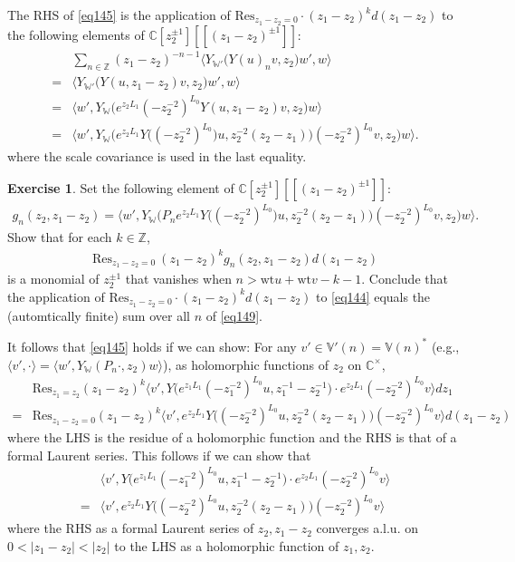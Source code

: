 \documentclass[11pt,b5paper,notitlepage]{article}
\theoremstyle{definition}
\newtheorem{exe}[df]{Exercise}
\theoremstyle{plain}
\newcommand{\Res}{\mathrm{Res}}
\newcommand{\bk}[1]{\langle {#1}\rangle}
\newcommand{\bigbk}[1]{\big\langle {#1}\big\rangle}
\newcommand{\Bigbk}[1]{\Big\langle {#1}\Big\rangle}
\newcommand{\Vbb}{\mathbb V}
\newcommand{\Wbb}{\mathbb W}
\newcommand{\Cbb}{\mathbb C}
\newcommand{\Nbb}{\mathbb N}
\newcommand{\Zbb}{\mathbb Z}
\newcommand{\wt}{\mathrm{wt}}
\numberwithin{equation}{section}
\begin{document}
The RHS of \eqref{eq145} is the application of $\Res_{z_1-z_2=0}\cdot (z_1-z_2)^kd(z_1-z_2)$ to the following  elements of $\Cbb[z_2^{\pm1}][[(z_1-z_2)^{\pm1}]]$:
\begin{align}
&\sum_{n\in\Zbb}(z_1-z_2)^{-n-1}\bigbk{Y_{\Wbb'}\big(Y(u)_nv,z_2\big)w',w}\nonumber\\
=&\bigbk{Y_{\Wbb'}\big(Y(u,z_1-z_2)v,z_2\big)w',w}\nonumber\\
=&\bigbk{w',Y_\Wbb\big(e^{z_2L_1}(-z_2^{-2})^{L_0}Y(u,z_1-z_2)v,z_2\big)w}\nonumber\\
=&\bigbk{w',Y_\Wbb\big(e^{z_2L_1}Y\big((-z_2^{-2})^{L_0})u,z_2^{-2}(z_2-z_1)\big)(-z_2^{-2})^{L_0}v,z_2\big)w}.\label{eq144}
\end{align}
where the scale covariance is used in the last equality.
\begin{exe}
Set the following element of $\Cbb[z_2^{\pm1}][[(z_1-z_2)^{\pm1}]]$:
\begin{align*}
g_n(z_2,z_1-z_2)=\bigbk{w',Y_\Wbb\big(P_ne^{z_2L_1}Y\big((-z_2^{-2})^{L_0})u,z_2^{-2}(z_2-z_1)\big)(-z_2^{-2})^{L_0}v,z_2\big)w}.	
\end{align*}
Show that for each $k\in\Zbb$,
\begin{align}
\Res_{z_1-z_2=0}~(z_1-z_2)^kg_n(z_2,z_1-z_2)d(z_1-z_2)	\label{eq149}
\end{align}
is a monomial of $z_2^{\pm1}$ that vanishes when $n>\wt u+\wt v-k-1$. Conclude that the application of $\Res_{z_1-z_2=0}\cdot (z_1-z_2)^kd(z_1-z_2)$ to \eqref{eq144} equals the (automtically finite) sum over all $n$ of \eqref{eq149}.
\end{exe}


It follows that \eqref{eq145} holds 
if we can show: For any $v'\in\Vbb'(n)=\Vbb(n)^*$ (e.g.,  $\bk{v',\cdot}=\bk{w',Y_\Wbb(P_n\cdot,z_2)w}$), as holomorphic functions of $z_2$ on $\Cbb^\times$,
\begin{align}
&\Res_{z_1=z_2}(z_1-z_2)^k\bigbk{v',Y\big(e^{z_1L_1}(-z_1^{-2})^{L_0}u,z_1^{-1}-z_2^{-1}\big)\cdot e^{z_2L_1}(-z_2^{-2})^{L_0}v}dz_1\nonumber\\
=&	\Res_{z_1-z_2=0}(z_1-z_2)^k \bigbk{v',e^{z_2L_1}Y\big((-z_2^{-2})^{L_0}u,z_2^{-2}(z_2-z_1)\big)(-z_2^{-2})^{L_0}v}d(z_1-z_2)\label{eq146}
\end{align}
where the LHS is the residue of a holomorphic function and the RHS is that of a formal Laurent series. This follows if we can show that
\begin{align}
	&\bigbk{v',Y\big(e^{z_1L_1}(-z_1^{-2})^{L_0}u,z_1^{-1}-z_2^{-1}\big)\cdot e^{z_2L_1}(-z_2^{-2})^{L_0}v}\nonumber\\
	=&\bigbk{v',e^{z_2L_1}Y\big((-z_2^{-2})^{L_0}u,z_2^{-2}(z_2-z_1)\big)(-z_2^{-2})^{L_0}v}\label{eq148}
\end{align}
where the RHS as a formal Laurent series of $z_2,z_1-z_2$ converges a.l.u. on $0<|z_1-z_2|<|z_2|$ to the LHS as a holomorphic function of $z_1,z_2$.
\end{document}
